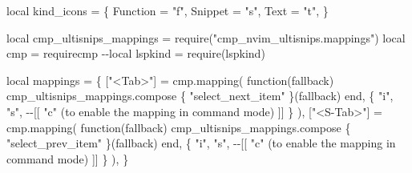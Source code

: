 \documentclass[
  letterpaper,
  DIV=11,
  numbers=noendperiod,
  oneside]{scrartcl}
\newenvironment{Shaded}{\begin{snugshade}}{\end{snugshade}}
\newcommand{\AttributeTok}[1]{\textcolor[rgb]{0.40,0.45,0.13}{#1}}
\newcommand{\BuiltInTok}[1]{\textcolor[rgb]{0.00,0.23,0.31}{#1}}
\newcommand{\ErrorTok}[1]{\textcolor[rgb]{0.68,0.00,0.00}{#1}}
\newcommand{\ExtensionTok}[1]{\textcolor[rgb]{0.00,0.23,0.31}{#1}}
\newcommand{\KeywordTok}[1]{\textcolor[rgb]{0.00,0.23,0.31}{#1}}
\newcommand{\NormalTok}[1]{\textcolor[rgb]{0.00,0.23,0.31}{#1}}
\newcommand{\OperatorTok}[1]{\textcolor[rgb]{0.37,0.37,0.37}{#1}}
\newcommand{\StringTok}[1]{\textcolor[rgb]{0.13,0.47,0.30}{#1}}
\newcommand{\VariableTok}[1]{\textcolor[rgb]{0.07,0.07,0.07}{#1}}
\begin{document}
\begin{Shaded}
\begin{Highlighting}[]

\BuiltInTok{local} \VariableTok{kind\_icons} \OperatorTok{=}\NormalTok{ \{}
  \ExtensionTok{Function}\NormalTok{ = }\StringTok{"f"}\NormalTok{,}
  \ExtensionTok{Snippet}\NormalTok{ = }\StringTok{"s"}\NormalTok{,}
  \ExtensionTok{Text}\NormalTok{ = }\StringTok{"t"}\NormalTok{,}
\ErrorTok{\}}

\BuiltInTok{local} \VariableTok{cmp\_ultisnips\_mappings} \OperatorTok{=} \VariableTok{require(}\StringTok{"cmp\_nvim\_ultisnips.mappings"}\VariableTok{)}
\BuiltInTok{local} \VariableTok{cmp} \OperatorTok{=} \VariableTok{require}\StringTok{\textquotesingle{}cmp\textquotesingle{}}
\ExtensionTok{{-}{-}local}\NormalTok{ lspkind = require}\ErrorTok{(}\StringTok{\textquotesingle{}lspkind\textquotesingle{}}\KeywordTok{)}

\BuiltInTok{local} \VariableTok{mappings} \OperatorTok{=}\NormalTok{ \{}
  \ExtensionTok{[}\StringTok{"\textless{}Tab\textgreater{}"}\ExtensionTok{]}\NormalTok{ = cmp.mapping}\ErrorTok{(}
    \KeywordTok{function(}\ExtensionTok{fallback}\KeywordTok{)}
      \ExtensionTok{cmp\_ultisnips\_mappings.compose}\NormalTok{ \{ }\StringTok{"select\_next\_item"}\NormalTok{ \}}\ErrorTok{(}\ExtensionTok{fallback}\KeywordTok{)}
    \ExtensionTok{end,}
    \KeywordTok{\{} \StringTok{"i"}\ExtensionTok{,} \StringTok{"s"}\NormalTok{, }\AttributeTok{{-}{-}[[} \StringTok{"c"} \ErrorTok{(}\ExtensionTok{to}\NormalTok{ enable the mapping in command mode}\KeywordTok{)} \ExtensionTok{]]}\NormalTok{ \}}
  \ErrorTok{)}\ExtensionTok{,}
  \ExtensionTok{[}\StringTok{"\textless{}S{-}Tab\textgreater{}"}\ExtensionTok{]}\NormalTok{ = cmp.mapping}\ErrorTok{(}
    \KeywordTok{function(}\ExtensionTok{fallback}\KeywordTok{)}
      \ExtensionTok{cmp\_ultisnips\_mappings.compose}\NormalTok{ \{ }\StringTok{"select\_prev\_item"}\NormalTok{ \}}\ErrorTok{(}\ExtensionTok{fallback}\KeywordTok{)}
    \ExtensionTok{end,}
    \KeywordTok{\{} \StringTok{"i"}\ExtensionTok{,} \StringTok{"s"}\NormalTok{, }\AttributeTok{{-}{-}[[} \StringTok{"c"} \ErrorTok{(}\ExtensionTok{to}\NormalTok{ enable the mapping in command mode}\KeywordTok{)} \ExtensionTok{]]}\NormalTok{ \}}
  \ErrorTok{)}\ExtensionTok{,}
\KeywordTok{\}}


\end{Highlighting}
\end{Shaded}
\end{document}
